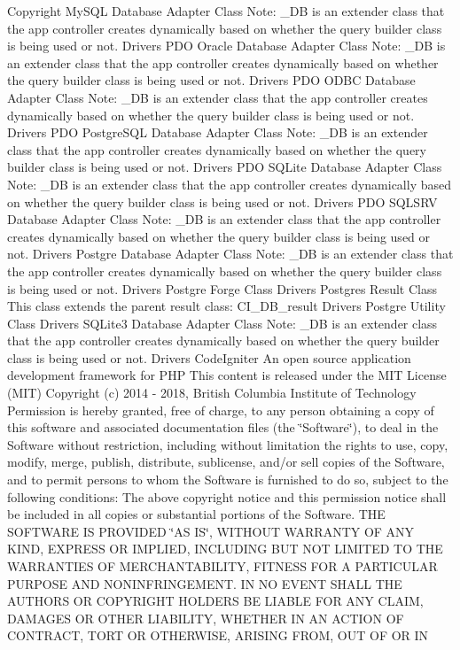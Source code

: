\begin{DoxyCopyright}{Copyright}
My\+S\+QL Database Adapter Class Note\+: \+\_\+\+DB is an extender class that the app controller creates dynamically based on whether the query builder class is being used or not.  Drivers P\+DO Oracle Database Adapter Class Note\+: \+\_\+\+DB is an extender class that the app controller creates dynamically based on whether the query builder class is being used or not.  Drivers P\+DO O\+D\+BC Database Adapter Class Note\+: \+\_\+\+DB is an extender class that the app controller creates dynamically based on whether the query builder class is being used or not.  Drivers P\+DO Postgre\+S\+QL Database Adapter Class Note\+: \+\_\+\+DB is an extender class that the app controller creates dynamically based on whether the query builder class is being used or not.  Drivers P\+DO S\+Q\+Lite Database Adapter Class Note\+: \+\_\+\+DB is an extender class that the app controller creates dynamically based on whether the query builder class is being used or not.  Drivers P\+DO S\+Q\+L\+S\+RV Database Adapter Class Note\+: \+\_\+\+DB is an extender class that the app controller creates dynamically based on whether the query builder class is being used or not.  Drivers Postgre Database Adapter Class Note\+: \+\_\+\+DB is an extender class that the app controller creates dynamically based on whether the query builder class is being used or not.  Drivers Postgre Forge Class  Drivers Postgres Result Class This class extends the parent result class\+: C\+I\+\_\+\+D\+B\+\_\+result  Drivers Postgre Utility Class  Drivers S\+Q\+Lite3 Database Adapter Class Note\+: \+\_\+\+DB is an extender class that the app controller creates dynamically based on whether the query builder class is being used or not.  Drivers Code\+Igniter An open source application development framework for P\+HP This content is released under the M\+IT License (M\+IT) Copyright (c) 2014 -\/ 2018, British Columbia Institute of Technology Permission is hereby granted, free of charge, to any person obtaining a copy of this software and associated documentation files (the \char`\"{}\+Software\char`\"{}), to deal in the Software without restriction, including without limitation the rights to use, copy, modify, merge, publish, distribute, sublicense, and/or sell copies of the Software, and to permit persons to whom the Software is furnished to do so, subject to the following conditions\+: The above copyright notice and this permission notice shall be included in all copies or substantial portions of the Software. T\+HE S\+O\+F\+T\+W\+A\+RE IS P\+R\+O\+V\+I\+D\+ED \char`\"{}\+A\+S I\+S\char`\"{}, W\+I\+T\+H\+O\+UT W\+A\+R\+R\+A\+N\+TY OF A\+NY K\+I\+ND, E\+X\+P\+R\+E\+SS OR I\+M\+P\+L\+I\+ED, I\+N\+C\+L\+U\+D\+I\+NG B\+UT N\+OT L\+I\+M\+I\+T\+ED TO T\+HE W\+A\+R\+R\+A\+N\+T\+I\+ES OF M\+E\+R\+C\+H\+A\+N\+T\+A\+B\+I\+L\+I\+TY, F\+I\+T\+N\+E\+SS F\+OR A P\+A\+R\+T\+I\+C\+U\+L\+AR P\+U\+R\+P\+O\+SE A\+ND N\+O\+N\+I\+N\+F\+R\+I\+N\+G\+E\+M\+E\+NT. IN NO E\+V\+E\+NT S\+H\+A\+LL T\+HE A\+U\+T\+H\+O\+RS OR C\+O\+P\+Y\+R\+I\+G\+HT H\+O\+L\+D\+E\+RS BE L\+I\+A\+B\+LE F\+OR A\+NY C\+L\+A\+IM, D\+A\+M\+A\+G\+ES OR O\+T\+H\+ER L\+I\+A\+B\+I\+L\+I\+TY, W\+H\+E\+T\+H\+ER IN AN A\+C\+T\+I\+ON OF C\+O\+N\+T\+R\+A\+CT, T\+O\+RT OR O\+T\+H\+E\+R\+W\+I\+SE, A\+R\+I\+S\+I\+NG F\+R\+OM, O\+UT OF OR IN 
\end{DoxyCopyright}
